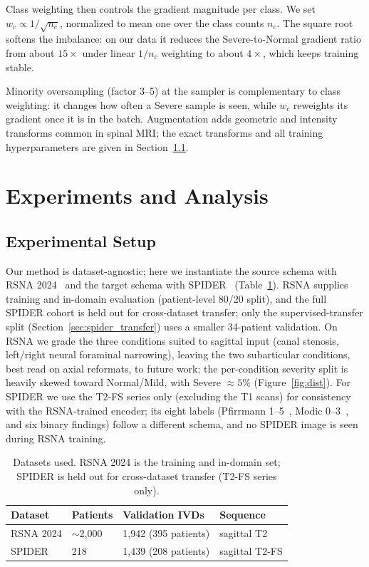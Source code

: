 \documentclass[runningheads]{llncs}
\begin{document}
Class weighting then controls the gradient magnitude per class. We set $w_c \propto 1/\sqrt{n_c}$, normalized to mean one over the class counts $n_c$. The square root softens the imbalance: on our data it reduces the Severe-to-Normal gradient ratio from about $15\times$ under linear $1/n_c$ weighting to about $4\times$, which keeps training stable.

Minority oversampling (factor 3--5) at the sampler is complementary to class weighting: it changes how often a Severe sample is seen, while $w_c$ reweights its gradient once it is in the batch. Augmentation adds geometric and intensity transforms common in spinal MRI; the exact transforms and all training hyperparameters are given in Section~\ref{exp1}.

\section{Experiments and Analysis}\label{sec4}

\subsection{Experimental Setup}\label{exp1}

Our method is dataset-agnostic; here we instantiate the source schema with RSNA 2024~\cite{kaggle2024} and the target schema with SPIDER~\cite{vandergraaf2024spider} (Table~\ref{tab:datasets}). RSNA supplies training and in-domain evaluation (patient-level 80/20 split), and the full SPIDER cohort is held out for cross-dataset transfer; only the supervised-transfer split (Section~\ref{sec:spider_transfer}) uses a smaller 34-patient validation. On RSNA we grade the three conditions suited to sagittal input (canal stenosis, left/right neural foraminal narrowing), leaving the two subarticular conditions, best read on axial reformats, to future work; the per-condition severity split is heavily skewed toward Normal/Mild, with Severe $\approx 5\%$ (Figure~\ref{fig:dist}). For SPIDER we use the T2-FS series only (excluding the T1 scans) for consistency with the RSNA-trained encoder; its eight labels (Pfirrmann 1--5~\cite{pfirrmann2001}, Modic 0--3~\cite{modic1988}, and six binary findings) follow a different schema, and no SPIDER image is seen during RSNA training.

\begin{table}[ht]
\centering
\caption{Datasets used. RSNA 2024 is the training and in-domain set; SPIDER is held out for cross-dataset transfer (T2-FS series only).}
\label{tab:datasets}
\footnotesize
\begin{tabular}{@{}llll@{}}
\toprule
Dataset & Patients & Validation IVDs & Sequence \\
\midrule
RSNA 2024 & $\sim$2{,}000 & 1{,}942 (395 patients) & sagittal T2 \\
SPIDER & 218 & 1{,}439 (208 patients) & sagittal T2-FS \\
\bottomrule
\end{tabular}
\end{table}
\end{document}
